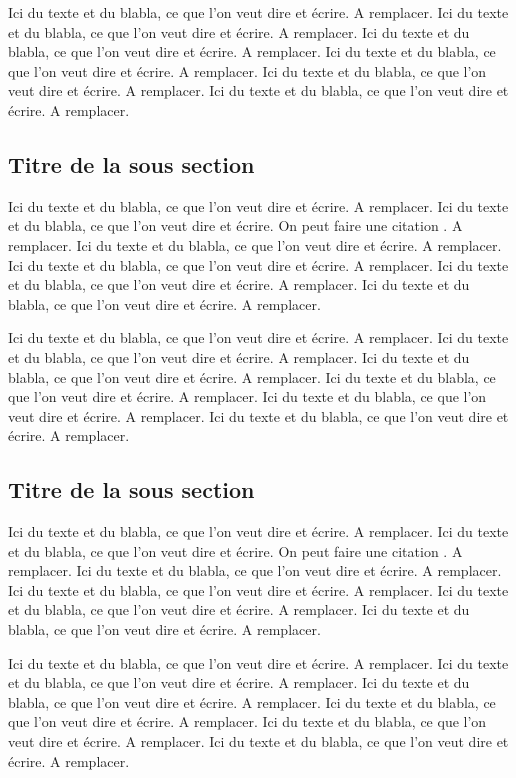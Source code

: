 Ici du texte et du blabla, ce que l'on veut dire et écrire. A remplacer. Ici du texte et du blabla, ce que l'on veut dire et écrire. A remplacer. Ici du texte et du blabla, ce que l'on veut dire et écrire. A remplacer. Ici du texte et du blabla, ce que l'on veut dire et écrire. A remplacer. Ici du texte et du blabla, ce que l'on veut dire et écrire. A remplacer. Ici du texte et du blabla, ce que l'on veut dire et écrire. A remplacer.

\subsection{Titre de la sous section}

Ici du texte et du blabla, ce que l'on veut dire et écrire. A remplacer. Ici du texte et du blabla, ce que l'on veut dire et écrire. On peut faire une citation \cite{Motclef1}.
A remplacer. Ici du texte et du blabla, ce que l'on veut dire et écrire. A remplacer. Ici du texte et du blabla, ce que l'on veut dire et écrire. A remplacer. Ici du texte et du blabla, ce que l'on veut dire et écrire. A remplacer. Ici du texte et du blabla, ce que l'on veut dire et écrire. A remplacer.

Ici du texte et du blabla, ce que l'on veut dire et écrire. A remplacer. Ici du texte et du blabla, ce que l'on veut dire et écrire. A remplacer.
Ici du texte et du blabla, ce que l'on veut dire et écrire. A remplacer. Ici du texte et du blabla, ce que l'on veut dire et écrire. A remplacer. Ici du texte et du blabla, ce que l'on veut dire et écrire. A remplacer. Ici du texte et du blabla, ce que l'on veut dire et écrire. A remplacer.

\subsection{Titre de la sous section}

Ici du texte et du blabla, ce que l'on veut dire et écrire. A remplacer. Ici du texte et du blabla, ce que l'on veut dire et écrire. On peut faire une citation \cite{Motclef1}.
A remplacer. Ici du texte et du blabla, ce que l'on veut dire et écrire. A remplacer. Ici du texte et du blabla, ce que l'on veut dire et écrire. A remplacer. Ici du texte et du blabla, ce que l'on veut dire et écrire. A remplacer. Ici du texte et du blabla, ce que l'on veut dire et écrire. A remplacer.

Ici du texte et du blabla, ce que l'on veut dire et écrire. A remplacer. Ici du texte et du blabla, ce que l'on veut dire et écrire. A remplacer.
Ici du texte et du blabla, ce que l'on veut dire et écrire. A remplacer. Ici du texte et du blabla, ce que l'on veut dire et écrire. A remplacer. Ici du texte et du blabla, ce que l'on veut dire et écrire. A remplacer. Ici du texte et du blabla, ce que l'on veut dire et écrire. A remplacer.

\clearpage
